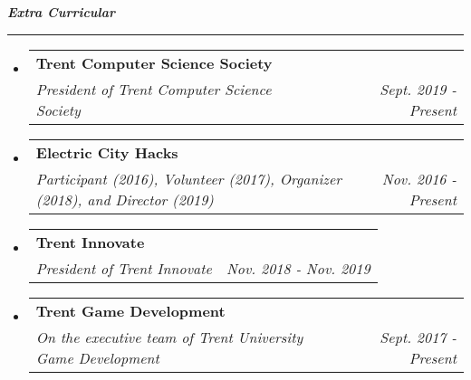 \documentclass[letterpaper,11pt]{article}
\makeatletter
\newcommand{\resitem}[1]{\item #1 \vspace{-2pt}}
\newcommand{\mysection}[1]{\vspace{5pt} {\bfseries \textsl{#1}} \\ {\color{gray} \rule[5pt]{\textwidth}{1pt}}}
\newcommand{\ressubheading}[4]{\begin{tabular*}{6.5in}{l@{\extracolsep{\fill}}r}
        \textbf{#1} & #2 \\
        \textit{#3} & \textit{#4} \\
\end{tabular*}\vspace{-6pt}}
\makeatother
\begin{document}
\mysection{Extra Curricular}
\begin{itemize}
    \item
        \ressubheading{Trent Computer Science Society}{}{President of Trent
        Computer Science Society}{Sept. 2019 - Present}
    \item
        \ressubheading{Electric City Hacks}{}{Participant (2016), Volunteer
            (2017), Organizer (2018), and Director (2019)}{Nov. 2016 - Present}
    \item
        \ressubheading{Trent Innovate}{}{President of Trent Innovate}{Nov. 2018 - Nov. 2019}
    \item
        \ressubheading{Trent Game Development}{}{On the executive team of
        Trent University Game Development}{Sept. 2017 - Present}
\end{itemize}
\end{document}
